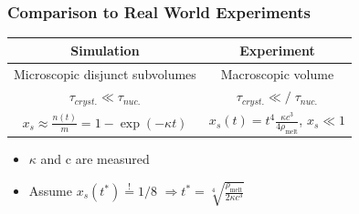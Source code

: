 \documentclass[smaller,notes=hide]{beamer}
\newlength{\wideitemsep}
\let\olditem\item
\renewcommand{\item}{\setlength{\itemsep}{\wideitemsep}\olditem}
\begin{document}
\begin{frame}
\frametitle{Comparison to Real World Experiments}
\begin{table}
\begin{center}
\begin{tabular}{c||c}
Simulation & Experiment\raisebox{-0.2cm}{ \makebox[0.0cm]{}}  \\ \hline \hline
Microscopic disjunct subvolumes & Macroscopic volume  \raisebox{-0.2cm}{ \makebox[0.0cm]{}} \raisebox{0.4cm}{ \makebox[0.0cm]{}} \\ \hline
$\tau_{cryst.} \ll \tau_{nuc.}$ & $\tau_{cryst.} \ll \!\!\!\!\!\!/ \; \tau_{nuc.}$  \raisebox{-0.2cm}{ \makebox[0.0cm]{}} \raisebox{0.35cm}{ \makebox[0.0cm]{}}\\ \hline
$x_s \approx \frac{n(t)}{m} = 1 - \exp (- \kappa t)$ & $x_s(t) = t^4 \frac{\kappa c^3}{4 \rho_{\text{melt}}} $, $x_s \ll 1$ \raisebox{-0.2cm}{ \makebox[0.0cm]{}} \raisebox{0.4cm}{ \makebox[0.0cm]{}}
\end{tabular}
\end{center}
\end{table}
\vspace{0.2cm}
\begin{itemize}
\item $\kappa$ and c are measured
\item Assume $x_s(t^*) \stackrel{!}{=} 1/8$ \quad  $ \Rightarrow t^* = \sqrt[4]{\frac{\rho_{\text{melt}}}{2 \kappa c^3 }} $ 
\end{itemize}
\end{frame}
\end{document}
